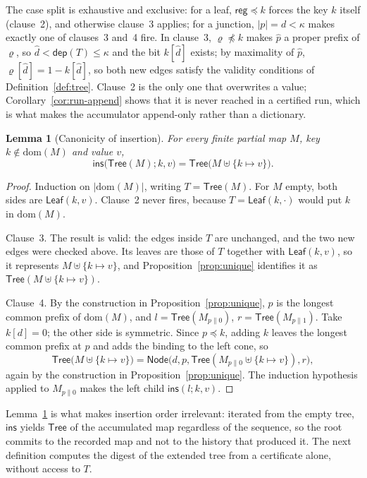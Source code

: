 \documentclass[11pt]{article}
\newtheorem{lemma}{Lemma}
\begin{document}
The case split is exhaustive and exclusive: for a leaf, $\mathsf{reg} \preceq k$ forces the key $k$ itself (clause~2), and otherwise clause~3 applies; for a junction, $|p| = d < \kappa$ makes exactly one of clauses~3 and~4 fire. In clause~3, $\varrho \not\preceq k$ makes $\hat p$ a proper prefix of $\varrho$, so $\hat d < \mathsf{dep}(T) \le \kappa$ and the bit $k[\hat d]$ exists; by maximality of $\hat p$, $\varrho[\hat d] = 1 - k[\hat d]$, so both new edges satisfy the validity conditions of Definition~\ref{def:tree}. Clause~2 is the only one that overwrites a value; Corollary~\ref{cor:run-append} shows that it is never reached in a certified run, which is what makes the accumulator append-only rather than a dictionary.

\begin{lemma}[Canonicity of insertion]
\label{lem:insert-canon}
For every finite partial map $M$, key $k \notin \mathrm{dom}(M)$ and value $v$,
\[
  \mathsf{ins}\bigl(\mathsf{Tree}(M);k,v\bigr) = \mathsf{Tree}\bigl(M \uplus \{k \mapsto v\}\bigr).
\]
\end{lemma}
\begin{proof}
Induction on $|\mathrm{dom}(M)|$, writing $T = \mathsf{Tree}(M)$. For $M$ empty, both sides are $\mathsf{Leaf}(k,v)$. Clause~2 never fires, because $T = \mathsf{Leaf}(k,\cdot)$ would put $k$ in $\mathrm{dom}(M)$.

Clause~3. The result is valid: the edges inside $T$ are unchanged, and the two new edges were checked above. Its leaves are those of $T$ together with $\mathsf{Leaf}(k,v)$, so it represents $M \uplus \{k \mapsto v\}$, and Proposition~\ref{prop:unique} identifies it as $\mathsf{Tree}(M \uplus \{k \mapsto v\})$.

Clause~4. By the construction in Proposition~\ref{prop:unique}, $p$ is the longest common prefix of $\mathrm{dom}(M)$, and $l = \mathsf{Tree}(M_{p\|0})$, $r = \mathsf{Tree}(M_{p\|1})$. Take $k[d]=0$; the other side is symmetric. Since $p \preceq k$, adding $k$ leaves the longest common prefix at $p$ and adds the binding to the left cone, so
\[
  \mathsf{Tree}\bigl(M \uplus \{k \mapsto v\}\bigr)
  = \mathsf{Node}\bigl(d,p,\mathsf{Tree}(M_{p\|0} \uplus \{k \mapsto v\}),r\bigr),
\]
again by the construction in Proposition~\ref{prop:unique}. The induction hypothesis applied to $M_{p\|0}$ makes the left child $\mathsf{ins}(l;k,v)$.
\end{proof}

Lemma~\ref{lem:insert-canon} is what makes insertion order irrelevant: iterated from the empty tree, $\mathsf{ins}$ yields $\mathsf{Tree}$ of the accumulated map regardless of the sequence, so the root commits to the recorded map and not to the history that produced it. The next definition computes the digest of the extended tree from a certificate alone, without access to $T$.
\end{document}

